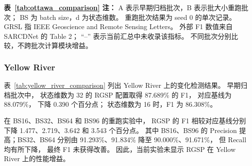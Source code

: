 \noindent
\smallskip
\begin{minipage}{\linewidth}
\footnotesize
\textbf{表~\ref{tab:ottawa_comparison} 注：}
A 表示早期归档批次，B 表示批大小重跑批次；
BS 为 batch size，d 为状态维数。
重跑批次结果为 seed 0 的单次记录。
GRSL 指 IEEE Geoscience and Remote Sensing Letters。
外部 F1 数值来自 SARCDNet 的 Table 2\cite{sarcdnet2026}；
``--'' 表示当前汇总中未收录该指标。
不同批次分别比较，不跨批次计算模块增益。
\end{minipage}
\endgroup
\FloatBarrier

\subsubsection{Yellow River}
\label{sec:yellow_river_results}

表~\ref{tab:yellow_river_comparison}
列出 Yellow River 上的变化检测结果。
早期归档批次中，
状态维数为 32 的 RGSP 配置取得
87.689\% 的 F1，
对应基线为 88.079\%，
下降 0.390 个百分点；
状态维数为 16 时，F1 为 86.308\%。

在 BS16、BS32、BS64 和 BS96 的重跑实验中，
RGSP 的 F1 相较对应基线分别下降
1.477、2.719、3.642 和 3.543 个百分点。
其中 BS16、BS96 的 Precision 提高；BS32、BS64 分别由 91.293\%、91.834\% 降至 90.000\%、91.671\%，
但 Recall 均有所下降，
最终 F1 未获得改善。
因此，当前实验未显示 RGSP 在
Yellow River 上的性能增益。

